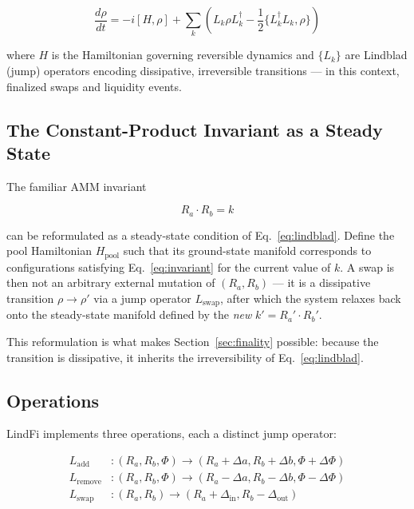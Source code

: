 \documentclass[11pt,a4paper]{article}
\begin{document}
\begin{equation}
    \frac{d\rho}{dt} = -i[H, \rho] + \sum_k \left( L_k \rho L_k^\dagger - \frac{1}{2}\{L_k^\dagger L_k, \rho\} \right)
    \label{eq:lindblad}
\end{equation}

where $H$ is the Hamiltonian governing reversible dynamics and $\{L_k\}$ are Lindblad (jump) operators encoding dissipative, irreversible transitions --- in this context, finalized swaps and liquidity events.

\subsection{The Constant-Product Invariant as a Steady State}

The familiar AMM invariant

\begin{equation}
    R_a \cdot R_b = k
    \label{eq:invariant}
\end{equation}

can be reformulated as a steady-state condition of Eq.~\eqref{eq:lindblad}. Define the pool Hamiltonian $H_{\text{pool}}$ such that its ground-state manifold corresponds to configurations satisfying Eq.~\eqref{eq:invariant} for the current value of $k$. A swap is then not an arbitrary external mutation of $(R_a, R_b)$ --- it is a dissipative transition $\rho \to \rho'$ via a jump operator $L_{\text{swap}}$, after which the system relaxes back onto the steady-state manifold defined by the \emph{new} $k' = R_a' \cdot R_b'$.

This reformulation is what makes Section~\ref{sec:finality} possible: because the transition is dissipative, it inherits the irreversibility of Eq.~\eqref{eq:lindblad}.

\subsection{Operations}

LindFi implements three operations, each a distinct jump operator:

\begin{align}
    L_{\text{add}}&: (R_a, R_b, \Phi) \to (R_a + \Delta a, R_b + \Delta b, \Phi + \Delta\Phi) \\
    L_{\text{remove}}&: (R_a, R_b, \Phi) \to (R_a - \Delta a, R_b - \Delta b, \Phi - \Delta\Phi) \\
    L_{\text{swap}}&: (R_a, R_b) \to (R_a + \Delta_{\text{in}}, R_b - \Delta_{\text{out}})
\end{align}
\end{document}
